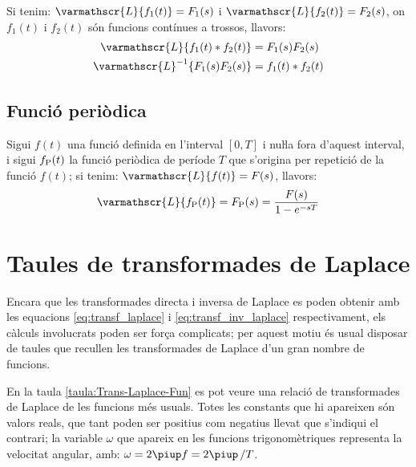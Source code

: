 Si tenim: $\varmathscr{L} \{f_1(t) \} = F_1(s)$ i $\varmathscr{L}
\{f_2(t) \} = F_2(s)$, on $f_1(t)$ i $f_2(t)$ són funcions
contínues a trossos, llavors:
\begin{align}
    \varmathscr{L} \{ f_1(t) * f_2(t) \} &= F_1(s) F_2(s)\\
    \varmathscr{L}^{-1} \{ F_1(s) F_2(s) \} &= f_1(t) * f_2(t)
\end{align}

\subsection{Funció periòdica}

Sigui $f(t)$ una funció definida en l'interval $[0,T]$ i nuŀla
fora d'aquest interval, i sigui $f_\mathrm{P}(t)$ la funció periòdica de
període $T$ que s'origina per repetició de la funció $f(t)$; si
tenim: $\varmathscr{L} \{f(t) \} = F(s)$, llavors:
\begin{equation}
   \varmathscr{L} \{f\ped{P}(t) \} = F\ped{P}(s) = \frac{F(s)}{1-e^{-sT}}
\end{equation}

\section{Taules de transformades de Laplace}

Encara que les transformades directa i inversa de Laplace es poden
obtenir amb les equacions \eqref{eq:transf_laplace} i
\eqref{eq:transf_inv_laplace} respectivament, els càlculs
involucrats poden ser força complicats; per aquest motiu és usual
disposar de taules que recullen les transformades de Laplace d'un
gran nombre de funcions.

En la taula \vref{taula:Trans-Laplace-Fun} es pot veure una relació de
transformades de Laplace de les funcions més usuals. Totes les
constants que hi apareixen són valors reals, que tant poden ser
positius com negatius llevat que s'indiqui el contrari; la variable
$\omega$ que apareix en les funcions trigonomètriques representa la
velocitat angular, amb: $\omega=2\piup f=2\piup\,/T$.

